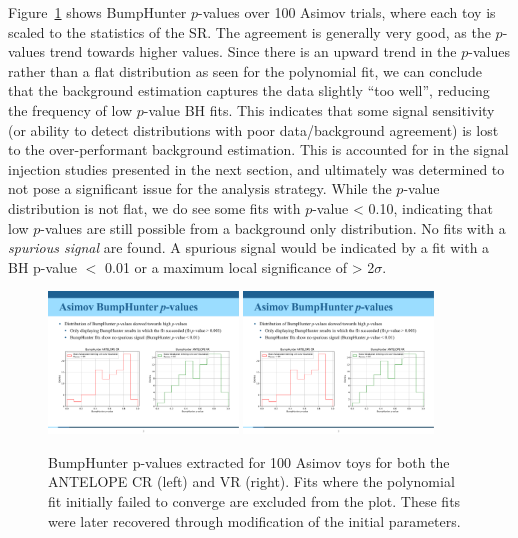 Figure~\ref{fig:bh_asimov_pvals} shows BumpHunter $p$-values over 100 Asimov trials, where each toy is scaled to the statistics of the SR.
The agreement is generally very good, as the $p$-values trend towards higher values.
Since there is an upward trend in the $p$-values rather than a flat distribution as seen for the polynomial fit, we can conclude that the background estimation captures the data slightly ``too well'', reducing the frequency of low $p$-value BH fits.
This indicates that some signal sensitivity (or ability to detect distributions with poor data/background agreement) is lost to the over-performant background estimation.
This is accounted for in the signal injection studies presented in the next section, and ultimately was determined to not pose a significant issue for the analysis strategy.
While the $p$-value distribution is not flat, we do see some fits with $p$-value < 0.10, indicating that low $p$-values are still possible from a background only distribution.
No fits with a \textit{spurious signal} are found.
A spurious signal would be indicated by a fit with a BH p-value $<$ 0.01 or a maximum local significance of > 2$\sigma$.
\begin{figure}[!htbp]
\centering
   \includegraphics[width=0.45\textwidth]{figures/stats/bh_asimov_pvals_cr}
   \includegraphics[width=0.45\textwidth]{figures/stats/bh_asimov_pvals_vr}
    \caption{BumpHunter p-values extracted for 100 Asimov toys for both the ANTELOPE CR (left) and VR (right). Fits where the polynomial fit initially failed to converge are excluded from the plot. These fits were later recovered through modification of the initial parameters.
    \label{fig:bh_asimov_pvals}}
\end{figure}

